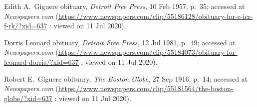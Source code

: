 \begin{thebibliography}{999}
	Edith A.\ Giguere obituary, \textit{Detroit Free Press}, 10 Feb 1957, p.\ 35; accessed at \textit{Newspapers.com} (\url{https://www.newspapers.com/clip/55186128/obituary-for-c-icr-f-rk/?xid=637} : viewed on 11 Jul 2020).
	
	Dorris Leonard obituary, \textit{Detroit Free Press}, 12 Jul 1981, p.\ 49; accessed at \textit{Newspapers.com} (\url{https://www.newspapers.com/clip/55184073/obituary-for-leonard-dorris/?xid=637} : viewed on 11 Jul 2020).
	
	Robert E.\ Giguere obituary, \textit{The Boston Globe}, 27 Sep 1916, p.\ 14; accessed at \textit{Newspapers.com} (\url{https://www.newspapers.com/clip/55181564/the-boston-globe/?xid=637} : viewed on 11 Jul 2020).

\end{thebibliography}